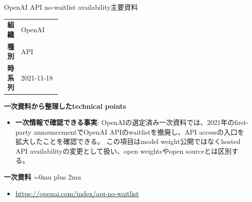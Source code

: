 \begin{technicalnote}{OpenAI API no-waitlist availability}{主要資料}
\begingroup
\begin{tabularx}{\linewidth}{@{}>{\bfseries}p{0.22\linewidth}X@{}}
組織 & OpenAI \\
種別 & API \\
時系列 & 2021-11-18 \\
\end{tabularx}
\smallskip
{\bfseries 一次資料から整理したtechnical points}
\begin{itemize}[leftmargin=1.5em,itemsep=0.35em]
\item \textbf{一次情報で確認できる事実}: OpenAIの選定済み一次資料では、2021年のfirst-party announcementでOpenAI APIのwaitlistを撤廃し、API accessの入口を拡大したことを確認できる。 この項目はmodel weight公開ではなくhosted API availabilityの変更として扱い、open weightsやopen sourceとは区別する。
\end{itemize}
\begin{minipage}{\linewidth}
\begin{samepage}
{\bfseries 一次資料}
\begingroup\sloppy
\Urlmuskip=0mu plus 2mu\relax
\begin{itemize}[leftmargin=1.5em,itemsep=0.25em]
\item {\scriptsize\url{https://openai.com/index/api-no-waitlist}}
\end{itemize}
\endgroup
\end{samepage}
\end{minipage}
\endgroup
\end{technicalnote}
\medskip


